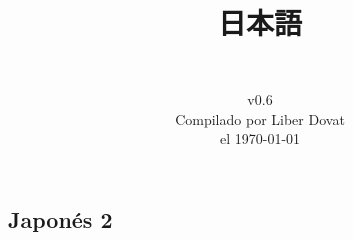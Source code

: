 \documentclass[a4paper,12pt,oneside]{report}
\begin{document}
\begin{CJK*}{UTF8}{min}%



  \title{
    \begin{flushright}
      \Huge  日本語\\
      \LARGE {}
    \end{flushright}
  } %

  \author{\vspace{7cm}\\
    v0.6\\
    Compilado por Liber Dovat\\
    el \today\\
  } %

  \date{}
  \maketitle

  \newpage


  \tableofcontents
  \thispagestyle{plain}

  \newpage




%
%
%


  \chapter{Japon\'es 2}
  \thispagestyle{contenido} %
  \pagestyle{contenido}     %


\end{CJK*}
\end{document}
